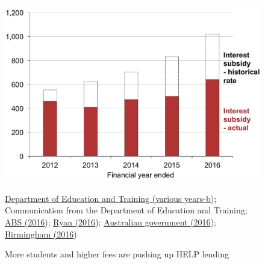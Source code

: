 \documentclass[embargoed]{grattan}
\begin{document}
\begin{figure}
\caption{More students and higher fees are pushing up HELP lending}\label{fig:fig4-more-students-higher-fees-are-pushing-up-HELP-lending}
\includegraphics[page=4]{atlas/Chartpack.pdf}

%
{\protect\hyperlink{_ENREF_36}{Department of Education and Training (various years-b}); Communication from the Department of Education and Training; \protect\hyperlink{_ENREF_6}{ABS (2016}); \protect\hyperlink{_ENREF_71}{Ryan (2016}); \protect\hyperlink{_ENREF_13}{Australian government (2016}); \protect\hyperlink{_ENREF_12}{Birmingham (2016})}
\end{figure}
\end{document}
